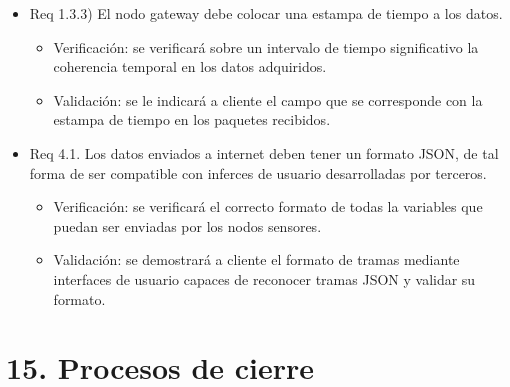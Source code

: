 \documentclass[
11pt, %
codirector, %
]{charter}
\begin{document}
\begin{itemize}
\item Req 1.3.3) El nodo gateway debe colocar una estampa de tiempo a los datos.

\begin{itemize}
	\item Verificación: se verificará sobre un intervalo de tiempo significativo la coherencia temporal en los datos adquiridos.
	\item Validación: se le indicará a cliente el campo que se corresponde con la estampa de tiempo en los paquetes recibidos.
\end{itemize}

\item Req 4.1. Los datos enviados a internet deben tener un formato JSON, de  tal forma de ser compatible con inferces de usuario desarrolladas por terceros.

\begin{itemize}
	\item Verificación: se verificará el correcto formato de todas la variables que puedan ser enviadas por los nodos sensores.
	\item Validación: se demostrará a cliente el formato de tramas mediante interfaces de usuario capaces de reconocer tramas JSON y validar su formato.
\end{itemize}

\end{itemize}

\section{15. Procesos de cierre}    
\label{sec:cierre}
\end{document}
